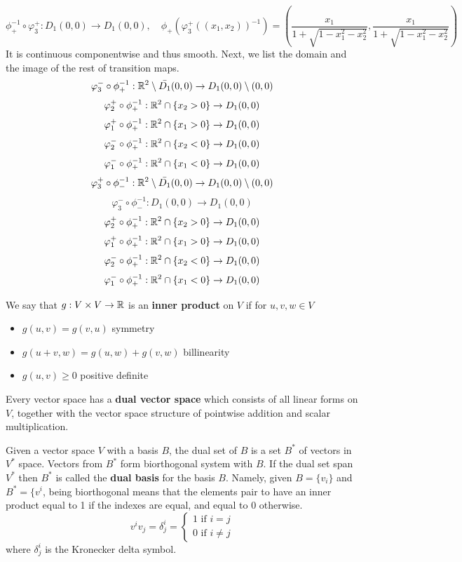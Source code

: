 \documentclass[11pt,a4paper]{report}
\begin{document}
$$ \phi_{+}^{-1} \circ \varphi_3^{+}: D_1 (0,0) \to D_1(0,0), \quad  \phi_{+}(\varphi_3^{+}((x_1,x_2) )^{-1}) = (\frac{x_1}{1+\sqrt{1-x_1^2-x_2^2}}, \frac{x_1}{1+\sqrt{1-x_1^2-x_2^2}})$$
It is continuous componentwise and thus smooth.
Next, we list the domain and the image of the rest of transition maps.
$$\varphi_3^{-} \circ \phi_{+}^{-1}: \mathbb{R}^2 \setminus \bar{D_1} (0,0) \to D_1(0,0) \setminus (0,0)$$
$$\varphi_2^{+} \circ \phi_{+}^{-1}: \mathbb{R}^2 \cap \{ x_2 > 0 \} \to D_1 (0,0)$$
$$\varphi_1^{+} \circ \phi_{+}^{-1}: \mathbb{R}^2 \cap \{ x_1 > 0 \} \to D_1 (0,0)$$
$$\varphi_2^{-} \circ \phi_{+}^{-1}: \mathbb{R}^2 \cap \{ x_2 < 0 \} \to D_1 (0,0)$$
$$\varphi_1^{-} \circ \phi_{+}^{-1}: \mathbb{R}^2 \cap \{ x_1 < 0 \} \to D_1 (0,0)$$
$$\varphi_3^{+} \circ \phi_{-}^{-1}: \mathbb{R}^2 \setminus \bar{D_1} (0,0) \to D_1(0,0) \setminus (0,0)$$
$$\varphi_3^{-} \circ \phi_{-}^{-1}: D_1 (0,0) \to D_1(0,0) $$
$$\varphi_2^{+} \circ \phi_{+}^{-1}: \mathbb{R}^2 \cap \{ x_2 > 0 \} \to D_1 (0,0)$$
$$\varphi_1^{+} \circ \phi_{+}^{-1}: \mathbb{R}^2 \cap \{ x_1 > 0 \} \to D_1 (0,0)$$
$$\varphi_2^{-} \circ \phi_{+}^{-1}: \mathbb{R}^2 \cap \{ x_2 < 0 \} \to D_1 (0,0)$$
$$\varphi_1^{-} \circ \phi_{+}^{-1}: \mathbb{R}^2 \cap \{ x_1 < 0 \} \to D_1 (0,0)$$
\begin{defn}
We say that $g: V \times V \to \mathbb{R} $ is an \textbf{inner product} on $V$ if for $u,v,w \in V$
\begin{itemize}
  \item $g(u,v) = g(v,u)$ symmetry
  \item $g(u+v,w) = g(u,w) + g(v,w)$ billinearity
  \item $g(u,v) \geq 0$ positive definite
\end{itemize}
\end{defn}
\begin{defn}
Every vector space has a \textbf{dual vector space} which consists of all linear forms on $V$,
together with the vector space structure of pointwise addition and scalar multiplication.
\end{defn}
\begin{defn}
Given a vector space $V$ with a basis $B$, the dual set of $B$ is a set $B^{*}$ of vectors in $V^{*}$ space.
Vectors from $B^{*}$ form biorthogonal system with $B$. If the dual set span $V^{*}$ then $B^{*}$ is called the \textbf{dual basis} for the basis $B$. 
Namely, given $B = \{ v_i \}$ and $B^{*} = \{ v^{i}$, being biorthogonal means that the elements pair to have an inner product equal to 1
if the indexes are equal, and equal to $0$ otherwise. 
$$ v^{i} v_{j} = \delta^{i}_{j} =  \begin{cases} 1 \text{ if } i = j  \\ 0 \text{ if } i \neq j  \end{cases} $$
where $\delta^{i}_{j}$ is the Kronecker delta symbol.
\end{defn}
\end{document}
